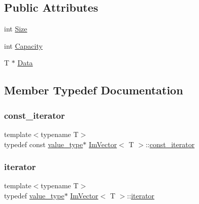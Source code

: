 \subsection*{Public Attributes}
\begin{DoxyCompactItemize}
\item 
int \hyperlink{class_im_vector_abbfd157947f66280d27b21d70a16df8d}{Size}
\item 
int \hyperlink{class_im_vector_abd24482b4d30d22e37582e521e5bfb33}{Capacity}
\item 
T $\ast$ \hyperlink{class_im_vector_ac0e46e8b30cb079d93c8f0aad7d7cbd0}{Data}
\end{DoxyCompactItemize}


\subsection{Member Typedef Documentation}
\hypertarget{class_im_vector_aedeac9c5080f9d6ce96ae837768ee4c4}{}\label{class_im_vector_aedeac9c5080f9d6ce96ae837768ee4c4} 
\subsubsection{\texorpdfstring{const\+\_\+iterator}{const\_iterator}}
{\footnotesize\ttfamily template$<$typename T$>$ \\
typedef const \hyperlink{class_im_vector_a8bd77e4e7581d8e5f9e98d7c2f3c2a80}{value\+\_\+type}$\ast$ \hyperlink{class_im_vector}{Im\+Vector}$<$ T $>$\+::\hyperlink{class_im_vector_aedeac9c5080f9d6ce96ae837768ee4c4}{const\+\_\+iterator}}

\hypertarget{class_im_vector_a74b5478f1f6fd471cc71219bce483db6}{}\label{class_im_vector_a74b5478f1f6fd471cc71219bce483db6} 
\subsubsection{\texorpdfstring{iterator}{iterator}}
{\footnotesize\ttfamily template$<$typename T$>$ \\
typedef \hyperlink{class_im_vector_a8bd77e4e7581d8e5f9e98d7c2f3c2a80}{value\+\_\+type}$\ast$ \hyperlink{class_im_vector}{Im\+Vector}$<$ T $>$\+::\hyperlink{class_im_vector_a74b5478f1f6fd471cc71219bce483db6}{iterator}}

\hypertarget{class_im_vector_a8bd77e4e7581d8e5f9e98d7c2f3c2a80}{}\label{class_im_vector_a8bd77e4e7581d8e5f9e98d7c2f3c2a80} 
